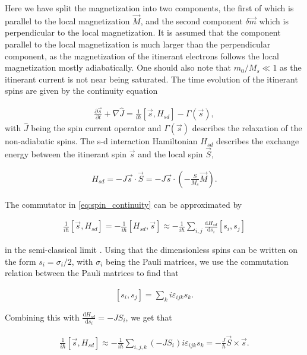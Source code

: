 \documentclass[1p]{elsarticle}		%
\numberwithin{equation}{section}
\begin{document}
Here we have split the magnetization into two components, the first of which is parallel to the local magnetization $\vec{M}$, and the second component $\delta\vec{m}$ which  is perpendicular to the local magnetization. It is assumed that the component parallel to the local magnetization is much larger than the perpendicular component, as the magnetization of the itinerant electrons follows the local magnetization mostly adiabatically. One should also note that $m_0/M_s \ll 1$ as the itinerant current is not near being saturated. The time evolution of the itinerant spins are given by the continuity equation

\begin{align}
\label{eq:spin_continuity}
\frac{\partial \vec{s}}{\partial t} + \nabla \hat{J} = \frac{1}{i\hbar} \left[ \vec{s}, H_{sd} \right] - \Gamma(\vec{s}),
\end{align}
with $\hat{J}$ being the spin current operator and $\Gamma(\vec{s})$ describes the relaxation of the non-adiabatic spins. The s-d interaction Hamiltonian $H_{sd}$ describes the exchange energy between the itinerant spin $\vec{s}$ and the local spin $\vec{S}$,

\begin{align}
H_{sd} = -J \vec{s} \cdot \vec{S} = -J \vec{s} \cdot (-\frac{S}{M_s} \vec{M}).
\end{align}

The commutator in \eqref{eq:spin_continuity} can be approximated by

\begin{align}
\frac{1}{i\hbar} \left[ \vec{s}, H_{sd} \right] = - \frac{1}{i\hbar} \left[ H_{sd}, \vec{s} \right] \approx -\frac{1}{i\hbar}\sum_{i, j} \frac{\textrm{d} H_{sd}}{\textrm{d} s_i}\left[ s_i, s_j \right]
\end{align}

in the semi-classical limit \citep{kruger2006current}. Using that the dimensionless spins can be written on the form $s_i = \sigma_i/2$, with $\sigma_i$ being the Pauli matrices, we use the commutation relation between the Pauli matrices to find that

\begin{align}
\left[ s_i, s_j \right] = \sum_k i\varepsilon_{ijk} s_k.
\end{align}

Combining this with $\frac{\textrm{d} H_{sd}}{\textrm{d} s_i} = -JS_i$, we get that

\begin{align}
\frac{1}{i\hbar} \left[ \vec{s}, H_{sd} \right] \approx - \frac{1}{i\hbar} \sum_{i,j, k} (-J S_i) i\varepsilon_{ijk}  s_k = -\frac{J}{\hbar} \vec{S} \times \vec{s}.
\end{align}
\end{document}
